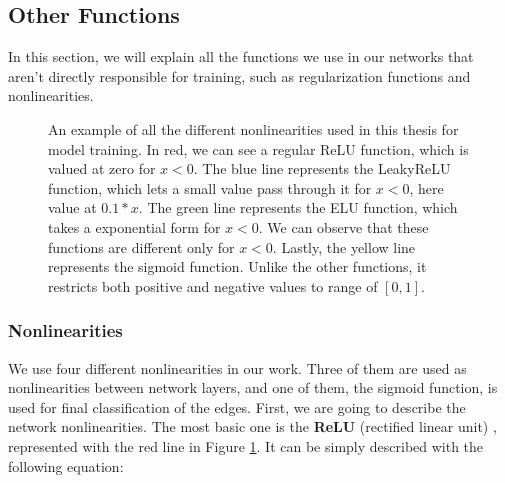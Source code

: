 \documentclass[times, utf8, diplomski, english]{fer_eng}
\begin{document}
\subsection{Other Functions}
\label{subsec:other functions}

In this section, we will explain all the functions we use in our networks that aren't directly responsible for training, such as regularization functions and nonlinearities.

\begin{figure}
	\centering
\caption{An example of all the different nonlinearities used in this thesis for model training. In red, we can see a regular ReLU function, which is valued at zero for $x<0$. The blue line represents the LeakyReLU function, which lets a small value pass through it for $x<0$, here value at $0.1*x$. The green line represents the ELU function, which takes a exponential form for $x<0$. We can observe that these functions are different only for $x<0$. Lastly, the yellow line represents the sigmoid function. Unlike the other functions, it restricts both positive and negative values to  range of $[0,1]$.}
\label{fig:nonlinearities}
\end{figure}

\subsubsection{Nonlinearities}
\label{subsubsec: nonlinearities}

We use four different nonlinearities in our work. Three of them are used as nonlinearities between network layers, and one of them, the sigmoid function, is used for final classification of the edges. First, we are going to describe the network nonlinearities. The most basic one is the \textbf{ReLU} (rectified linear unit) \cite{relu}, represented with the red line in Figure \ref{fig:nonlinearities}. It can be simply described with the following equation:
\end{document}
